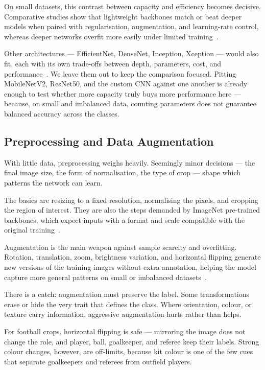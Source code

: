 \documentclass[preprint,12pt]{elsarticle}
\begin{document}
On small datasets, this contrast between capacity and efficiency becomes decisive. Comparative studies show that lightweight backbones match or beat deeper models when paired with regularisation, augmentation, and learning-rate control, whereas deeper networks overfit more easily under limited training~\cite{martins2025mobilenet}.

Other architectures --- EfficientNet, DenseNet, Inception, Xception --- would also fit, each with its own trade-offs between depth, parameters, cost, and performance~\cite{tan2019efficientnet,huang2017densely,szegedy2016rethinking,chollet2017xception}. We leave them out to keep the comparison focused. Pitting MobileNetV2, ResNet50, and the custom CNN against one another is already enough to test whether more capacity truly buys more performance here --- because, on small and imbalanced data, counting parameters does not guarantee balanced accuracy across the classes.

\subsection{Preprocessing and Data Augmentation}

With little data, preprocessing weighs heavily. Seemingly minor decisions --- the final image size, the form of normalisation, the type of crop --- shape which patterns the network can learn.

The basics are resizing to a fixed resolution, normalising the pixels, and cropping the region of interest. They are also the steps demanded by ImageNet pre-trained backbones, which expect inputs with a format and scale compatible with the original training~\cite{deng2009imagenet}.

Augmentation is the main weapon against sample scarcity and overfitting. Rotation, translation, zoom, brightness variation, and horizontal flipping generate new versions of the training images without extra annotation, helping the model capture more general patterns on small or imbalanced datasets~\cite{lewy2023augmentation}.

There is a catch: augmentation must preserve the label. Some transformations erase or hide the very trait that defines the class. Where orientation, colour, or texture carry information, aggressive augmentation hurts rather than helps.

For football crops, horizontal flipping is safe --- mirroring the image does not change the role, and player, ball, goalkeeper, and referee keep their labels. Strong colour changes, however, are off-limits, because kit colour is one of the few cues that separate goalkeepers and referees from outfield players.
\end{document}
